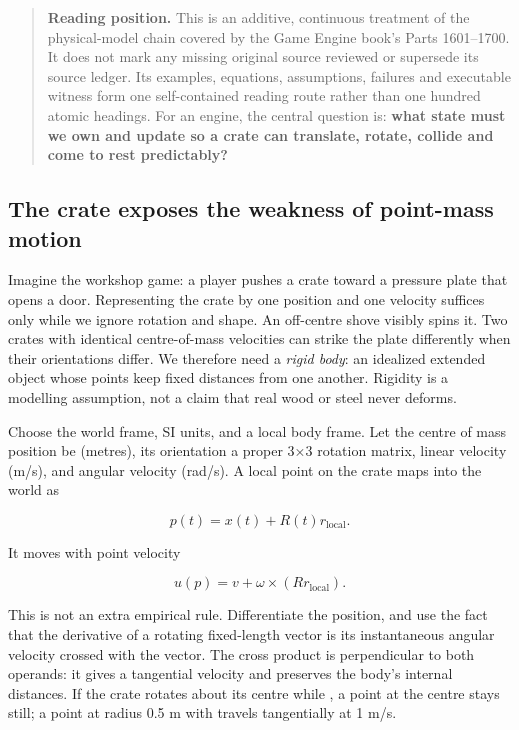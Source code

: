 \begin{quote}
\textbf{Reading position.} This is an additive, continuous treatment of the physical-model chain covered by the Game Engine book's Parts 1601--1700. It does not mark any missing original source reviewed or supersede its source ledger. Its examples, equations, assumptions, failures and executable witness form one self-contained reading route rather than one hundred atomic headings. For an engine, the central question is: \textbf{what state must we own and update so a crate can translate, rotate, collide and come to rest predictably?}
\end{quote}

\subsection{The crate exposes the weakness of point-mass motion}\label{02-foundations-ii-ch039-the-crate-exposes-the-weakness-of-point-mass-motion}

\hypertarget{02-foundations-ii-ch039-the-crate-exposes-the-weakness-of-point-mass-motion}{}

Imagine the workshop game: a player pushes a crate toward a pressure plate that opens a door. Representing the crate by one position and one velocity suffices only while we ignore rotation and shape. An off-centre shove visibly spins it. Two crates with identical centre-of-mass velocities can strike the plate differently when their orientations differ. We therefore need a \emph{rigid body}: an idealized extended object whose points keep fixed distances from one another. Rigidity is a modelling assumption, not a claim that real wood or steel never deforms.

Choose the world frame, SI units, and a local body frame. Let the centre of mass position be  (metres), its orientation  a proper 3×3 rotation matrix, linear velocity  (m/s), and angular velocity  (rad/s). A local point  on the crate maps into the world as

\[
p(t)=x(t)+R(t)r_{\mathrm{local}}.
\]

It moves with point velocity

\[
u(p)=v+\omega\times(Rr_{\mathrm{local}}).
\]

This is not an extra empirical rule. Differentiate the position, and use the fact that the derivative of a rotating fixed-length vector is its instantaneous angular velocity crossed with the vector. The cross product is perpendicular to both operands: it gives a tangential velocity and preserves the body's internal distances. If the crate rotates about its centre while , a point at the centre stays still; a point at radius 0.5 m with  travels tangentially at 1 m/s.

